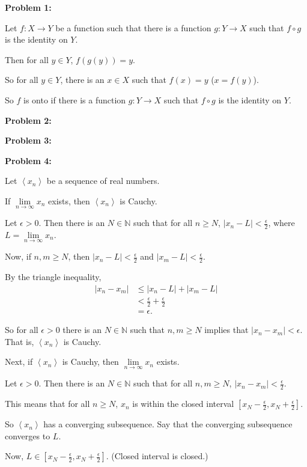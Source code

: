 \documentclass[a4paper,12pt]{article}
\newcommand{\tab}{\hspace{4mm}} %
\newcommand{\shunt}{\vspace{20mm}}
\newcommand{\absval}[1]{\lvert #1 \rvert}
\newcommand{\anbrack}[1]{\left\langle #1 \right\rangle}
\newcommand{\ep}{\epsilon}
\newcommand{\N}{\mathbb{N}}
\begin{document}
{\bf Problem 1:}

Let $f: X \to Y$ be a function such that there is a function $g: Y \to X$ such that $f \circ g$ is the identity on $Y$.

Then for all $y \in Y$, $f(g(y)) = y$.

So for all $y \in Y$, there is an $x \in X$ such that $f(x) = y$ ($x = f(y)$).

So $f$ is onto if there is a function $g: Y \to X$ such that $f \circ g$ is the identity on $Y$.

\shunt

{\bf Problem 2:}

\shunt

{\bf Problem 3:}

\shunt

{\bf Problem 4:}

Let $\anbrack{x_n}$ be a sequence of real numbers.

If $\lim\limits_{n \to \infty} x_n$ exists, then $\anbrack{x_n}$ is Cauchy.

\tab Let $\ep >0$. Then there is an $N \in \N$ such that for all $n \geq N$, $\absval{x_n - L} < \frac{\ep}{2}$, where $L = \lim\limits_{n \to \infty} x_n$.

\tab Now, if $n,m \geq N$, then $\absval{x_n - L} < \frac{\ep}{2}$ and $\absval{x_m - L} < \frac{\ep}{2}$.

\tab By the triangle inequality,
\begin{align*}
\absval{x_n - x_m} &\leq \absval{x_n - L} + \absval{x_m -L} \\
&< \frac{\ep}{2} + \frac{\ep}{2} \\
&= \ep.
\end{align*}

\tab So for all $\ep >0$ there is an $N \in \N$ such that $n,m \geq N$ implies that $\absval{x_n - x_m} < \ep$. That is, $\anbrack{x_n}$ is Cauchy.

Next, if $\anbrack{x_n}$ is Cauchy, then $\lim\limits_{n \to \infty} x_n$ exists.

\tab Let $\ep >0$. Then there is an $N \in \N$ such that for all $n,m \geq N$, $\absval{x_n - x_m} < \frac{\ep}{2}$.

\tab This means that for all $n \geq N$, $x_n$ is within the closed interval $[x_N - \frac{\ep}{2}, x_N +\frac{\ep}{2}]$.

\tab So $\anbrack{x_n}$ has a converging subsequence. Say that the converging subsequence converges to $L$.

\tab Now, $L \in [x_N - \frac{\ep}{2}, x_N +\frac{\ep}{2}]$. (Closed interval is closed.)
\end{document}
